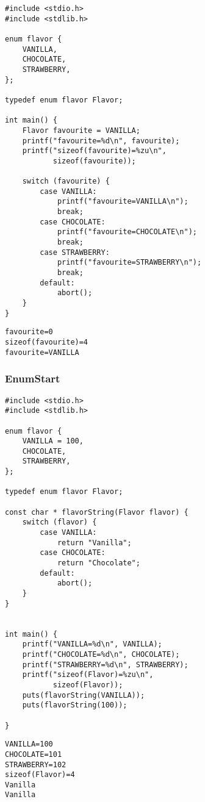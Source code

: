 \documentclass[11pt]{article}
\begin{document}
\begin{verbatim}
#include <stdio.h>
#include <stdlib.h>

enum flavor {
    VANILLA,
    CHOCOLATE,
    STRAWBERRY,
};

typedef enum flavor Flavor;

int main() {
    Flavor favourite = VANILLA;
    printf("favourite=%d\n", favourite);
    printf("sizeof(favourite)=%zu\n",
           sizeof(favourite));

    switch (favourite) {
        case VANILLA:
            printf("favourite=VANILLA\n");
            break;
        case CHOCOLATE:
            printf("favourite=CHOCOLATE\n");
            break;
        case STRAWBERRY:
            printf("favourite=STRAWBERRY\n");
            break;
        default:
            abort();
    }
}
\end{verbatim}

\begin{verbatim}
favourite=0
sizeof(favourite)=4
favourite=VANILLA
\end{verbatim}



\subsubsection{EnumStart}
\label{sec:orga01b68e}

\begin{verbatim}
#include <stdio.h>
#include <stdlib.h>

enum flavor {
    VANILLA = 100,
    CHOCOLATE,
    STRAWBERRY,
};

typedef enum flavor Flavor;

const char * flavorString(Flavor flavor) {
    switch (flavor) {
        case VANILLA:
            return "Vanilla";
        case CHOCOLATE:
            return "Chocolate";
        default:
            abort();
    }
}


int main() {
    printf("VANILLA=%d\n", VANILLA);
    printf("CHOCOLATE=%d\n", CHOCOLATE);
    printf("STRAWBERRY=%d\n", STRAWBERRY);
    printf("sizeof(Flavor)=%zu\n",
           sizeof(Flavor));
    puts(flavorString(VANILLA));
    puts(flavorString(100));

}
\end{verbatim}

\begin{verbatim}
VANILLA=100
CHOCOLATE=101
STRAWBERRY=102
sizeof(Flavor)=4
Vanilla
Vanilla
\end{verbatim}
\end{document}
